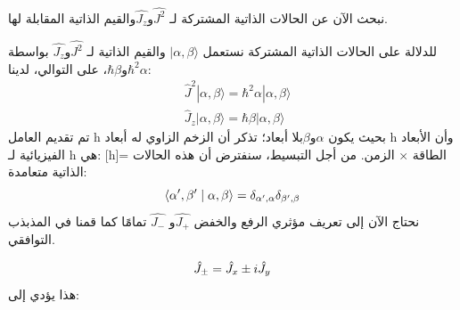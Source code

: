  
نبحث الآن عن الحالات الذاتية المشتركة لـ $\hat{J^{2}}$و$\hat{J_{z}}$والقيم الذاتية المقابلة لها.

 للدلالة على الحالات الذاتية المشتركة نستعمل 
$|\alpha, \beta\rangle  $
والقيم الذاتية لـ $\hat{J^{2}}$و$\hat{J_{z}}$ بواسطة  $\hbar^2 \alpha $و$\hbar \beta$، على التوالي، لدينا:
\begin{equation}
\begin{aligned}
	& \hat{J}^2|\alpha, \beta\rangle=\hbar^2 \alpha|\alpha, \beta\rangle \\
	& \hat{J}_{z}|\alpha, \beta\rangle=\hbar \beta|\alpha, \beta\rangle
\end{aligned}
\end{equation}
تم تقديم العامل h بحيث يكون $\alpha$و$\beta$بلا أبعاد؛ تذكر أن الزخم الزاوي له أبعاد h وأن الأبعاد الفيزيائية لـ h هي: [h]= الطاقة × الزمن. من أجل التبسيط، سنفترض أن هذه الحالات الذاتية متعامدة:
\begin{equation}
 \left\langle\alpha^{\prime}, \beta^{\prime} \mid \alpha, \beta\right\rangle=\delta_{\alpha^{\prime}, \alpha} \delta_{\beta^{\prime}, \beta}  \\
\end{equation}
نحتاج الآن إلى تعريف مؤثري الرفع والخفض $ \hat{J_{+}} $و $\hat{J_{-}}$ تمامًا كما قمنا في المذبذب التوافقي.

\begin{equation}
	 \hat{J}_{ \pm}=\hat{J}_x \pm i \hat{J}_y \\
\end{equation}
هذا يؤدي إلى:


